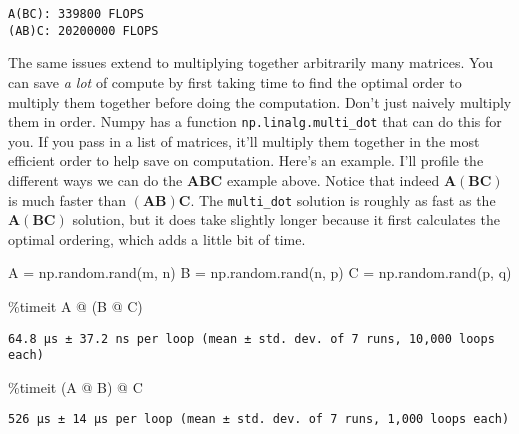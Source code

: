 \documentclass[
  letterpaper,
  DIV=11,
  numbers=noendperiod]{scrreprt}
\newenvironment{Shaded}{\begin{snugshade}}{\end{snugshade}}
\newcommand{\NormalTok}[1]{\textcolor[rgb]{0.00,0.23,0.31}{#1}}
\newcommand{\OperatorTok}[1]{\textcolor[rgb]{0.37,0.37,0.37}{#1}}
\begin{document}
\begin{verbatim}
A(BC): 339800 FLOPS
(AB)C: 20200000 FLOPS
\end{verbatim}

The same issues extend to multiplying together arbitrarily many
matrices. You can save \emph{a lot} of compute by first taking time to
find the optimal order to multiply them together before doing the
computation. Don't just naively multiply them in order. Numpy has a
function \texttt{np.linalg.multi\_dot} that can do this for you. If you
pass in a list of matrices, it'll multiply them together in the most
efficient order to help save on computation. Here's an example. I'll
profile the different ways we can do the
\(\mathbf{A}\mathbf{B}\mathbf{C}\) example above. Notice that indeed
\(\mathbf{A}(\mathbf{B}\mathbf{C})\) is much faster than
\((\mathbf{A}\mathbf{B})\mathbf{C}\). The \texttt{multi\_dot} solution
is roughly as fast as the \(\mathbf{A}(\mathbf{B}\mathbf{C})\) solution,
but it does take slightly longer because it first calculates the optimal
ordering, which adds a little bit of time.

\begin{Shaded}
\begin{Highlighting}[]
\NormalTok{A }\OperatorTok{=}\NormalTok{ np.random.rand(m, n)}
\NormalTok{B }\OperatorTok{=}\NormalTok{ np.random.rand(n, p)}
\NormalTok{C }\OperatorTok{=}\NormalTok{ np.random.rand(p, q)}
\end{Highlighting}
\end{Shaded}

\begin{Shaded}
\begin{Highlighting}[]
\OperatorTok{\%}\NormalTok{timeit A }\OperatorTok{@}\NormalTok{ (B }\OperatorTok{@}\NormalTok{ C)}
\end{Highlighting}
\end{Shaded}

\begin{verbatim}
64.8 µs ± 37.2 ns per loop (mean ± std. dev. of 7 runs, 10,000 loops each)
\end{verbatim}

\begin{Shaded}
\begin{Highlighting}[]
\OperatorTok{\%}\NormalTok{timeit (A }\OperatorTok{@}\NormalTok{ B) }\OperatorTok{@}\NormalTok{ C}
\end{Highlighting}
\end{Shaded}

\begin{verbatim}
526 µs ± 14 µs per loop (mean ± std. dev. of 7 runs, 1,000 loops each)
\end{verbatim}
\end{document}
